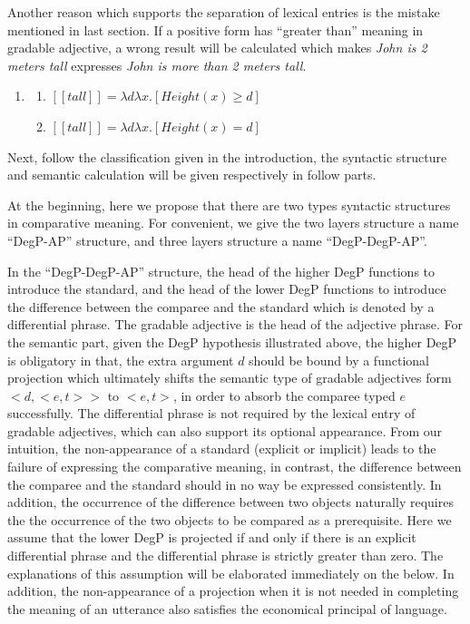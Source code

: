 \documentclass{ctexart}
\begin{document}
Another reason which supports the separation of lexical entries is the mistake mentioned in last section. If a positive form has ``greater than'' meaning in gradable adjective, a wrong result will be calculated which makes \textit{John is 2 meters tall} expresses \textit{John is more than 2 meters tall}.

\begin{enumerate}
    \item \label{tallLE_re}
    
    \begin{enumerate}
        \item \label{tallLE_re_a} 
        $[\![tall]\!]=\lambda d \lambda x.[Height(x) \geq d]$
    
        \item \label{tallLE_re_b} 
        $[\![tall]\!]=\lambda d \lambda x.[Height(x) = d]$
    
    \end{enumerate}
\end{enumerate}

Next, follow the classification given in the introduction, the syntactic structure and semantic calculation will be given respectively in follow parts.

\noindent
At the beginning, here we propose that there are two types syntactic structures in comparative meaning. For convenient, we give the two layers structure a name ``DegP-AP'' structure, and three layers structure a name ``DegP-DegP-AP''. 

In the ``DegP-DegP-AP'' structure, the head of the higher DegP functions to introduce the standard, and the head of the lower DegP functions to introduce the difference between the comparee and the standard which is denoted by a differential phrase. The gradable adjective is the head of the adjective phrase. For the semantic part, given the DegP hypothesis illustrated above, the higher DegP is obligatory in that, the extra argument $d$ should be bound by a functional projection which ultimately shifts the semantic type of gradable adjectives form $<d,<e,t>>$ to $<e,t>$, in order to absorb the comparee typed $e$ successfully. The differential phrase is not required by the lexical entry of gradable adjectives, which can also support its optional appearance. From our intuition, the non-appearance of a standard (explicit or implicit) leads to the failure of expressing the comparative meaning, in contrast, the difference between the comparee and the standard should in no way be expressed consistently. In addition, the occurrence of the difference between two objects naturally requires the the occurrence of the two objects to be compared as a prerequisite. Here we assume that the lower DegP is projected if and only if there is an explicit differential phrase and the differential phrase is strictly greater than zero. The explanations of this assumption will be elaborated immediately on the below. In addition, the non-appearance of a projection when it is not needed in completing the meaning of an utterance also satisfies the economical principal of language.
\end{document}
